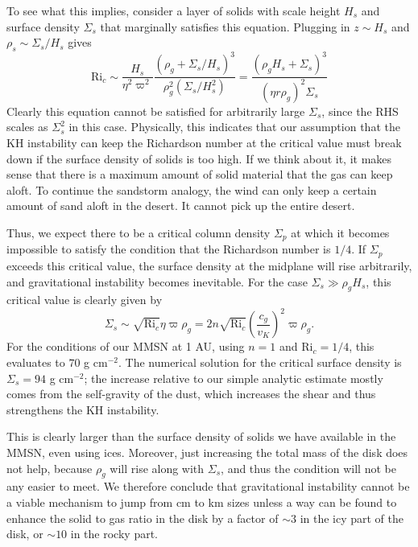 To see what this implies, consider a layer of solids with scale height $H_s$ and surface density $\Sigma_s$ that marginally satisfies this equation. Plugging in $z\sim H_s$ and $\rho_s \sim \Sigma_s/H_s$ gives
\begin{equation}
\mbox{Ri}_c \sim \frac{H_s}{\eta^2 \varpi^2} \frac{(\rho_g + \Sigma_s/H_s)^3}{\rho_g^2 (\Sigma_s/H_s^2)} = \frac{(\rho_g H_s + \Sigma_s)^3}{(\eta r \rho_g)^2 \Sigma_s}
\end{equation}
Clearly this equation cannot be satisfied for arbitrarily large $\Sigma_s$, since the RHS scales as $\Sigma_s^2$ in this case. Physically, this indicates that our assumption that the KH instability can keep the Richardson number at the critical value must break down if the surface density of solids is too high. If we think about it, it makes sense that there is a maximum amount of solid material that the gas can keep aloft. To continue the sandstorm analogy, the wind can only keep a certain amount of sand aloft in the desert. It cannot pick up the entire desert.

Thus, we expect there to be a critical column density $\Sigma_p$ at which it becomes impossible to satisfy the condition that the Richardson number is $1/4$. If $\Sigma_p$ exceeds this critical value, the surface density at the midplane will rise arbitrarily, and gravitational instability becomes inevitable. For the case $\Sigma_s \gg \rho_g H_s$, this critical value is clearly given by
\begin{equation}
\Sigma_s \sim \sqrt{\mbox{Ri}_c} \eta \varpi \rho_g = 2 n \sqrt{\mbox{Ri}_c} \left(\frac{c_g}{v_K}\right)^2 \varpi \rho_g.
\end{equation}
For the conditions of our MMSN at 1 AU, using $n=1$ and $\mbox{Ri}_c=1/4$, this evaluates to $70$ g cm$^{-2}$. The numerical solution for the critical surface density is $\Sigma_s=94$ g cm$^{-2}$; the increase relative to our simple analytic estimate mostly comes from the self-gravity of the dust, which increases the shear and thus strengthens the KH instability.

This is clearly larger than the surface density of solids we have available in the MMSN, even using ices. Moreover, just increasing the total mass of the disk does not help, because $\rho_g$ will rise along with $\Sigma_s$, and thus the condition will not be any easier to meet. We therefore conclude that gravitational instability cannot be a viable mechanism to jump from cm to km sizes unless a way can be found to enhance the solid to gas ratio in the disk by a factor of $\sim 3$ in the icy part of the disk, or $\sim 10$ in the rocky part. 

